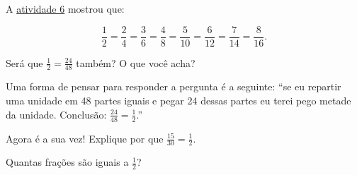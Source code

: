 \begin{refletindo*}{}{}
  A \hyperref[chap4-ativ6]{atividade 6} mostrou que: 
  
  \[\frac{1}{2} = \frac{2}{4} = \frac{3}{6} = \frac{4}{8} = \frac{5}{10} = \frac{6}{12} = \frac{7}{14} = \frac{8}{16}.\]
  
  Será que $\frac{1}{2} = \frac{24}{48}$ também? O que você acha? 
  
  Uma forma de pensar para responder a pergunta é a seguinte: ``se eu repartir uma unidade em 48 partes iguais e pegar 24 dessas partes eu terei pego metade da unidade. Conclusão: $\frac{24}{48} = \frac{1}{2}$.'' 
  
  Agora é a sua vez! Explique por que $\frac{15}{30} = \frac{1}{2}$. 

  Quantas frações são iguais a $\frac{1}{2}$?
\end{refletindo*}


